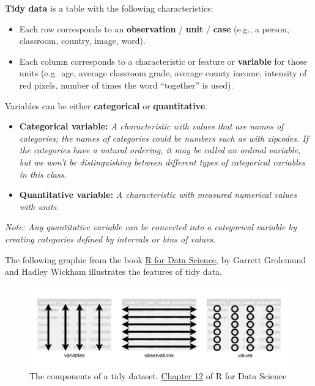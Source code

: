 \documentclass[
]{book}
\providecommand{\tightlist}{%
  \setlength{\itemsep}{0pt}\setlength{\parskip}{0pt}}
\begin{document}
\textbf{Tidy data} is a table with the following characteristics:

\begin{itemize}
\tightlist
\item
  Each row corresponds to an \textbf{observation} / \textbf{unit} / \textbf{case} (e.g., a person, classroom, country, image, word).
\item
  Each column corresponds to a characteristic or feature or \textbf{variable} for those units (e.g.~age, average classroom grade, average county income, intensity of red pixels, number of times the word ``together'' is used).
\end{itemize}

Variables can be either \textbf{categorical} or \textbf{quantitative}.

\begin{itemize}
\item
  \textbf{Categorical variable:} \emph{A characteristic with values that are names of categories; the names of categories could be numbers such as with zipcodes. If the categories have a natural ordering, it may be called an ordinal variable, but we won't be distinguishing between different types of categorical variables in this class.}
\item
  \textbf{Quantitative variable:} \emph{A characteristic with measured numerical values with units.}
\end{itemize}

\emph{Note: Any quantitative variable can be converted into a categorical variable by creating categories defined by intervals or bins of values.}

The following graphic from the book \href{http://r4ds.had.co.nz/}{R for Data Science}, by Garrett Grolemund and Hadley Wickham illustrates the features of tidy data.

\begin{figure}
\centering
\includegraphics{Photos/tidy.png}
\caption{The components of a tidy dataset. \href{http://r4ds.had.co.nz/tidy-data.html}{Chapter 12} of R for Data Science}
\end{figure}
\end{document}
